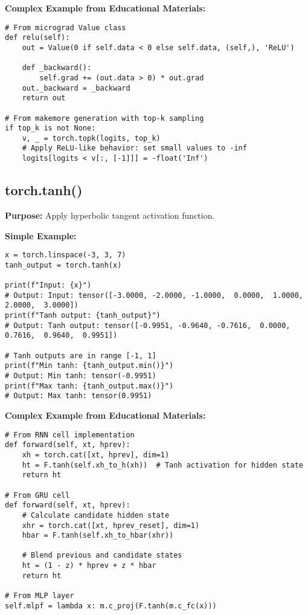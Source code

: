 \documentclass[11pt,a4paper]{book}
\begin{document}
\textbf{Complex Example from Educational Materials:}
\begin{verbatim}
# From micrograd Value class
def relu(self):
    out = Value(0 if self.data < 0 else self.data, (self,), 'ReLU')
    
    def _backward():
        self.grad += (out.data > 0) * out.grad
    out._backward = _backward
    return out

# From makemore generation with top-k sampling
if top_k is not None:
    v, _ = torch.topk(logits, top_k)
    # Apply ReLU-like behavior: set small values to -inf
    logits[logits < v[:, [-1]]] = -float('Inf')
\end{verbatim}

\subsection{torch.tanh()}

\textbf{Purpose:} Apply hyperbolic tangent activation function.

\textbf{Simple Example:}
\begin{verbatim}
x = torch.linspace(-3, 3, 7)
tanh_output = torch.tanh(x)

print(f"Input: {x}")
# Output: Input: tensor([-3.0000, -2.0000, -1.0000,  0.0000,  1.0000,  2.0000,  3.0000])
print(f"Tanh output: {tanh_output}")
# Output: Tanh output: tensor([-0.9951, -0.9640, -0.7616,  0.0000,  0.7616,  0.9640,  0.9951])

# Tanh outputs are in range [-1, 1]
print(f"Min tanh: {tanh_output.min()}")
# Output: Min tanh: tensor(-0.9951)
print(f"Max tanh: {tanh_output.max()}")
# Output: Max tanh: tensor(0.9951)
\end{verbatim}

\textbf{Complex Example from Educational Materials:}
\begin{verbatim}
# From RNN cell implementation
def forward(self, xt, hprev):
    xh = torch.cat([xt, hprev], dim=1)
    ht = F.tanh(self.xh_to_h(xh))  # Tanh activation for hidden state
    return ht

# From GRU cell
def forward(self, xt, hprev):
    # Calculate candidate hidden state
    xhr = torch.cat([xt, hprev_reset], dim=1)
    hbar = F.tanh(self.xh_to_hbar(xhr))
    
    # Blend previous and candidate states
    ht = (1 - z) * hprev + z * hbar
    return ht

# From MLP layer
self.mlpf = lambda x: m.c_proj(F.tanh(m.c_fc(x)))
\end{verbatim}
\end{document}
